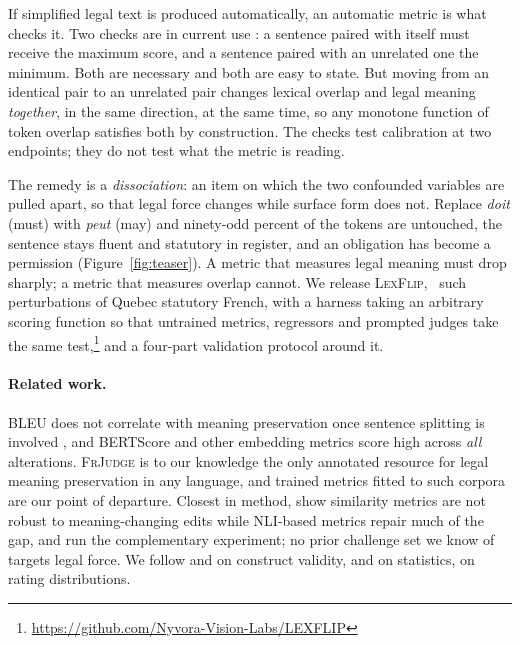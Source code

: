 \documentclass[11pt]{article}
\begin{document}
If simplified legal text is produced automatically, an automatic metric is what
checks it. Two checks are in current use \citep{beauchemin2023meaningbert,
beauchemin2025judgebert}: a sentence paired with itself must receive the maximum
score, and a sentence paired with an unrelated one the minimum. Both are
necessary and both are easy to state. But moving from an identical pair to an
unrelated pair changes lexical overlap and legal meaning \emph{together}, in the
same direction, at the same time, so any monotone function of token overlap
satisfies both by construction.
The checks test calibration at two endpoints; they do not test what the metric
is reading.

The remedy is a \emph{dissociation}: an item on which the two confounded
variables are pulled apart, so that legal force changes while surface form does
not. Replace \emph{doit} (must) with \emph{peut} (may) and ninety-odd percent of
the tokens are untouched, the sentence stays fluent and statutory in register,
and an obligation has become a permission (Figure~\ref{fig:teaser}). A metric
that measures legal meaning must drop sharply; a metric that measures overlap
cannot. We release
\textsc{LexFlip}, \numedits\ such perturbations of Quebec statutory French,
with a harness taking an arbitrary scoring function so that untrained metrics,
regressors and prompted judges take the same
test,\footnote{\url{https://github.com/Nyvora-Vision-Labs/LEXFLIP}} and a
four-part validation protocol around it.

\paragraph{Related work.}
BLEU does not correlate with meaning preservation once sentence splitting is
involved \citep{sulem2018bleu}, and BERTScore \citep{zhang2019bertscore} and
other embedding metrics score high across \emph{all} alterations.
\textsc{FrJudge} \citep{beauchemin2025judgebert} is to our knowledge the only
annotated resource for legal meaning preservation in any language, and trained
metrics fitted to such corpora \citep{beauchemin2023meaningbert} are our point
of departure. Closest in method, \citet{chen2023menli} show similarity metrics
are not robust to meaning-changing edits while NLI-based metrics repair much of
the gap, and \citet{mujahid2026stress} run the complementary experiment; no
prior challenge set we know of targets legal force. We follow
\citet{bean2025construct} and \citet{pacchiardi2024cleverhans} on construct
validity, \citet{deutsch2021statistical} and \citet{graham2014williams} on
statistics, \citet{xu2026disagreement} on rating distributions.
\end{document}
